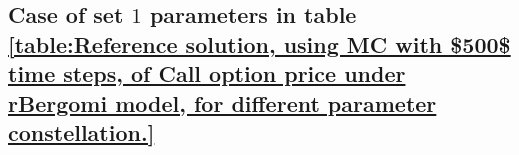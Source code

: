 
\subsection{Case of set $1$ parameters in table \ref{table:Reference solution, using MC with $500$ time steps, of Call option price under rBergomi model, for different parameter constellation.}}\label{appendix:Case of set 1 parameters}

